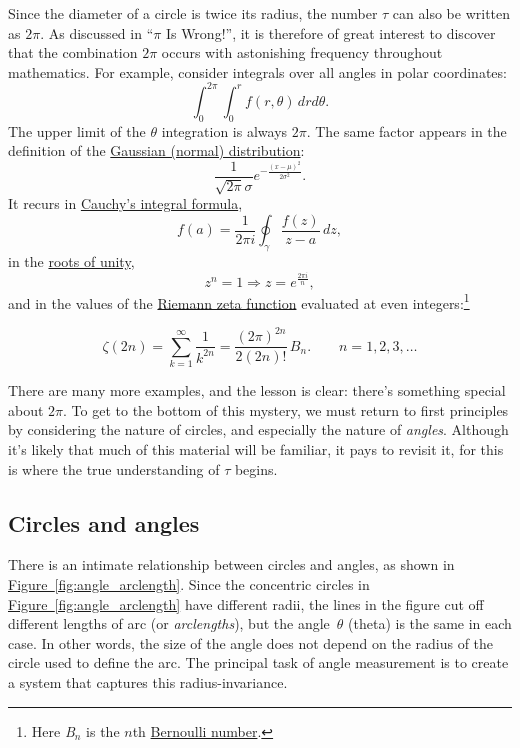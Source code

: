 \documentclass{article}
\begin{document}
Since the diameter of a circle is twice its radius, the number $\tau$ can also be written as $2\pi$. As discussed in ``$\pi$ Is Wrong!'', it is therefore of great interest to discover that the combination $2\pi$ occurs with astonishing frequency throughout mathematics. For example, consider integrals over all angles in polar coordinates:
\[
  \int_0^{2\pi}\int_0^r f(r, \theta)\, dr d\theta.
\]
The upper limit of the $\theta$ integration is always $2\pi$. The same factor appears in the definition of the \href{http://en.wikipedia.org/wiki/Normal_distribution}{Gaussian (normal) distribution}:
\[
  \frac{1}{\sqrt{2\pi}\sigma}e^{-\frac{(x-\mu)^2}{2\sigma^2}}.
\]
It recurs in \href{http://en.wikipedia.org/wiki/Cauchy's_integral_formula}{Cauchy's integral formula},
\[
  f(a) = \frac{1}{2\pi i}\oint_\gamma\frac{f(z)}{z-a}\,dz,
\]
in the \href{http://en.wikipedia.org/wiki/Root_of_unity}{roots of unity},
\[
  z^n = 1 \Rightarrow z = e^\frac{2\pi i}{n},
\]
and in the values of the \href{http://en.wikipedia.org/wiki/Riemann_zeta_function}{Riemann zeta function} evaluated at even integers:\footnote{Here \emph{B}$_n$ is the $n$th \href{http://en.wikipedia.org/wiki/Bernoulli_number}{Bernoulli number}.}

\[
  \zeta(2n) = \sum_{k=1}^\infty \frac{1}{k^{2n}} = \frac{(2\pi)^{2n}}{2(2n)!}\,B_n.\qquad n = 1, 2, 3, \ldots
\]

There are many more examples, and the lesson is clear: there's something special about $2\pi$. To get to the bottom of this mystery, we must return to first principles by considering the nature of circles, and especially the nature of \emph{angles}. Although it's likely that much of this material will be familiar, it pays to revisit it, for this is where the true understanding of $\tau$ begins.

  \subsection{Circles and angles} %
  \label{sec:circles_and_angles}

There is an intimate relationship between circles and angles, as shown in \hyperref[fig:angle_arclength]{Figure~}\ref{fig:angle_arclength}. Since the concentric circles in \hyperref[fig:angle_arclength]{Figure~}\ref{fig:angle_arclength} have different radii, the lines in the figure cut off different lengths of arc (or \emph{arclengths}), but the angle~$\theta$ (theta) is the same in each case. In other words, the size of the angle does not depend on the radius of the circle used to define the arc. The principal task of angle measurement is to create a system that captures this radius-invariance.
\end{document}
